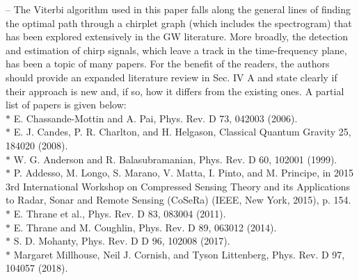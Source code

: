 \documentclass{article}
\begin{document}
\noindent
-- The Viterbi algorithm used in this paper falls along the general lines of finding the optimal path through a chirplet graph (which includes the spectrogram) that has been explored extensively in the GW literature. More broadly, the detection and estimation of chirp signals, which leave a track in the time-frequency plane, has been a topic of many papers. For the benefit of the readers, the authors should provide an expanded literature review in Sec. IV A and state clearly if their approach is new and, if so, how it differs from the existing ones. A partial list of papers is given below: \\    
$\ast$ E. Chassande-Mottin and A. Pai, Phys. Rev. D 73, 042003 (2006). \\
$\ast$ E. J. Candes, P. R. Charlton, and H. Helgason, Classical Quantum Gravity 25, 184020 (2008).   \\
$\ast$ W. G. Anderson and R. Balasubramanian, Phys. Rev. D 60, 102001 (1999).   \\
$\ast$ P. Addesso, M. Longo, S. Marano, V. Matta, I. Pinto, and M. Principe, in 2015 3rd International Workshop on  Compressed Sensing Theory and its Applications to Radar, Sonar and Remote Sensing (CoSeRa) (IEEE, New York, 2015), p. 154.   \\
$\ast$ E. Thrane et al., Phys. Rev. D 83, 083004 (2011).   \\
$\ast$ E. Thrane and M. Coughlin, Phys. Rev. D 89, 063012 (2014).    \\
$\ast$ S. D. Mohanty, Phys. Rev. D  D 96, 102008 (2017).   \\
$\ast$ Margaret Millhouse, Neil J. Cornish, and Tyson Littenberg, Phys. Rev. D 97, 104057 (2018).\\
\end{document}
